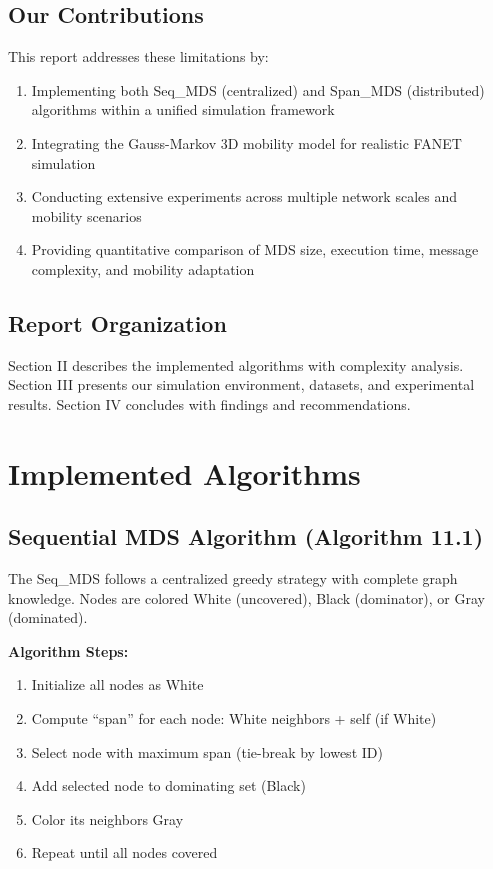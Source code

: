 \documentclass[conference]{IEEEtran}
\begin{document}
\subsection{Our Contributions}
This report addresses these limitations by:
\begin{enumerate}
    \item Implementing both Seq\_MDS (centralized) and Span\_MDS (distributed) algorithms within a unified simulation framework
    \item Integrating the Gauss-Markov 3D mobility model for realistic FANET simulation
    \item Conducting extensive experiments across multiple network scales and mobility scenarios
    \item Providing quantitative comparison of MDS size, execution time, message complexity, and mobility adaptation
\end{enumerate}

\subsection{Report Organization}
Section II describes the implemented algorithms with complexity analysis. Section III presents our simulation environment, datasets, and experimental results. Section IV concludes with findings and recommendations.

\section{Implemented Algorithms}

\subsection{Sequential MDS Algorithm (Algorithm 11.1)}
The Seq\_MDS follows a centralized greedy strategy with complete graph knowledge. Nodes are colored White (uncovered), Black (dominator), or Gray (dominated).

\textbf{Algorithm Steps:}
\begin{enumerate}
    \item Initialize all nodes as White
    \item Compute ``span'' for each node: White neighbors + self (if White)
    \item Select node with maximum span (tie-break by lowest ID)
    \item Add selected node to dominating set (Black)
    \item Color its neighbors Gray
    \item Repeat until all nodes covered
\end{enumerate}
\end{document}
